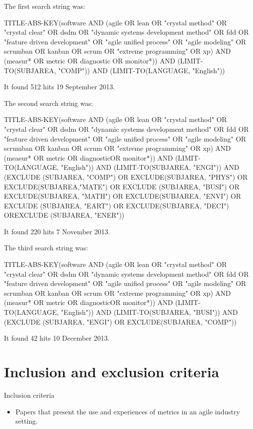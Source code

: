 \documentclass{sig-alternate}
\begin{document}
The first search string was:

TITLE-ABS-KEY(software AND (agile OR lean OR "crystal method" OR "crystal
clear" OR dsdm OR "dynamic systems development method" OR fdd OR "feature
driven development" OR "agile unified process" OR "agile modeling" OR scrumban
OR kanban OR scrum OR "extreme programming" OR xp) AND (measur* OR metric OR
diagnostic OR monitor*)) AND (LIMIT-TO(SUBJAREA, "COMP")) AND
(LIMIT-TO(LANGUAGE, "English"))

It found 512 hits 19 September 2013.

The second search string was:

TITLE-ABS-KEY(software AND (agile OR lean OR "crystal method" OR "crystal
clear" OR dsdm OR "dynamic systems development method" OR fdd OR "feature
driven development" OR "agile unified process" OR "agile modeling" OR scrumban
OR kanban OR scrum OR "extreme programming" OR xp) AND (measur* OR metric OR
diagnosticOR monitor*)) AND (LIMIT-TO(LANGUAGE, "English")) AND
(LIMIT-TO(SUBJAREA, "ENGI")) AND (EXCLUDE (SUBJAREA, "COMP") OR
EXCLUDE(SUBJAREA, "PHYS") OR EXCLUDE(SUBJAREA,"MATE") OR EXCLUDE (SUBJAREA,
"BUSI") OR EXCLUDE(SUBJAREA, "MATH") OR EXCLUDE(SUBJAREA, "ENVI") OR
EXCLUDE (SUBJAREA, "EART") OR EXCLUDE(SUBJAREA, "DECI") OREXCLUDE (SUBJAREA,
"ENER"))

It found 220 hits 7 November 2013.

The third search string was:

TITLE-ABS-KEY(software AND (agile OR lean OR "crystal method" OR "crystal
clear" OR dsdm OR "dynamic systems development method" OR fdd OR "feature
driven development" OR "agile unified process" OR "agile modeling" OR scrumban
OR kanban OR scrum OR "extreme programming" OR xp) AND (measur* OR metric OR
diagnosticOR monitor*)) AND (LIMIT-TO(LANGUAGE, "English")) AND
(LIMIT-TO(SUBJAREA, "BUSI")) AND (EXCLUDE (SUBJAREA, "ENGI") OR
EXCLUDE(SUBJAREA, "COMP"))

It found 42 hits 10 December 2013.

\section{Inclusion and exclusion criteria}
\label{app:Criteria}

Inclusion criteria
\begin{itemize}
  \item Papers that present the use and experiences of metrics in an agile
  industry setting.
\end{itemize}
\end{document}
